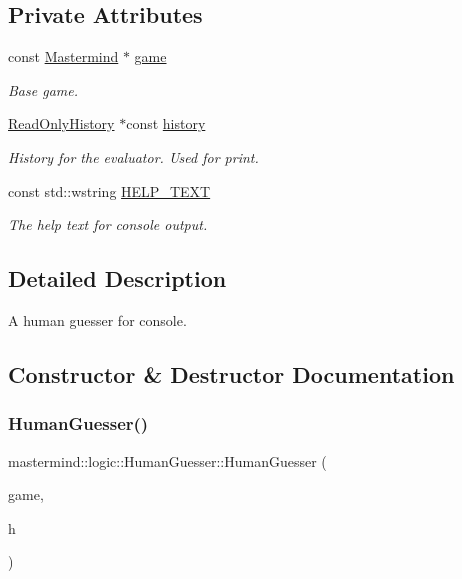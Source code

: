 \subsection*{Private Attributes}
\begin{DoxyCompactItemize}
\item 
const \hyperlink{classmastermind_1_1logic_1_1_mastermind}{Mastermind} $\ast$ \hyperlink{classmastermind_1_1logic_1_1_human_guesser_a36934ed862366c1d0e15e14302a23ff8}{game}
\begin{DoxyCompactList}\small\item\em Base game. \end{DoxyCompactList}\item 
\hyperlink{classmastermind_1_1logic_1_1_read_only_history}{Read\+Only\+History} $\ast$const \hyperlink{classmastermind_1_1logic_1_1_human_guesser_aa6d916119121bed7fbdf7f1af9807b58}{history}
\begin{DoxyCompactList}\small\item\em History for the evaluator. Used for print. \end{DoxyCompactList}\item 
const std\+::wstring \hyperlink{classmastermind_1_1logic_1_1_human_guesser_a8df8372c5f59e73e88ad023dd66d590f}{H\+E\+L\+P\+\_\+\+T\+E\+XT}
\begin{DoxyCompactList}\small\item\em The help text for console output. \end{DoxyCompactList}\end{DoxyCompactItemize}


\subsection{Detailed Description}
A human guesser for console. 

\subsection{Constructor \& Destructor Documentation}
\hypertarget{classmastermind_1_1logic_1_1_human_guesser_a8898e930a7d0fd76d796844f600f34de}{}\label{classmastermind_1_1logic_1_1_human_guesser_a8898e930a7d0fd76d796844f600f34de} 
\subsubsection{\texorpdfstring{Human\+Guesser()}{HumanGuesser()}}
{\footnotesize\ttfamily mastermind\+::logic\+::\+Human\+Guesser\+::\+Human\+Guesser (\begin{DoxyParamCaption}\item[{const \hyperlink{classmastermind_1_1logic_1_1_mastermind}{Mastermind} $\ast$}]{game,  }\item[{\hyperlink{classmastermind_1_1logic_1_1_read_only_history}{Read\+Only\+History} $\ast$}]{h }\end{DoxyParamCaption})}



